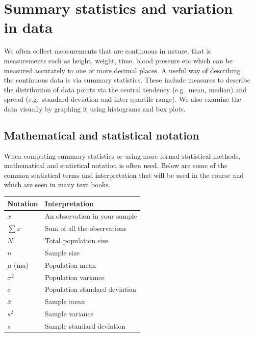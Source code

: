 \documentclass[
]{memoir}
\begin{document}
\hypertarget{summary-statistics-and-variation-in-data}{%
\section{Summary statistics and variation in data}\label{summary-statistics-and-variation-in-data}}

We often collect measurements that are continuous in nature, that is measurements such as height, weight, time, blood pressure etc which can be measured accurately to one or more decimal places. A useful way of describing the continuous data is via summary statistics. These include measures to describe the distribution of data points via the central tendency (e.g.~mean, median) and spread (e.g.~standard deviation and inter quartile range). We also examine the data visually by graphing it using histograms and box plots.

\hypertarget{mathematical-and-statistical-notation}{%
\subsection{Mathematical and statistical notation}\label{mathematical-and-statistical-notation}}

When computing summary statistics or using more formal statistical methods, mathematical and statistical notation is often used. Below are some of the common statistical terms and interpretation that will be used in the course and which are seen in many text books.

\begin{longtable}[]{@{}ll@{}}
\toprule
Notation & Interpretation \\
\midrule
\endhead
\(x\) & An observation in your sample \\
\(\sum x\) & Sum of all the observations \\
\(N\) & Total population size \\
\(n\) & Sample size \\
\(\mu\) (mu) & Population mean \\
\(\sigma^2\) & Population variance \\
\(\sigma\) & Population standard deviation \\
\(\bar{x}\) & Sample mean \\
\(s^2\) & Sample variance \\
\(s\) & Sample standard deviation \\
\bottomrule
\end{longtable}
\end{document}
